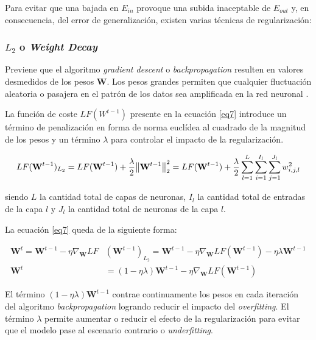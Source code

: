 Para evitar que una bajada en $E_{in}$ provoque una subida inaceptable de $E_{out}$ y, en consecuencia, del error de generalización, existen varias técnicas de regularización:

\subsubsection{$L_2$ o \textit{Weight Decay}}
Previene que el algoritmo \textit{gradient descent} o \textit{backpropagation} resulten en valores desmedidos de los pesos $\textbf{W}$. Los pesos grandes permiten que cualquier fluctuación aleatoria o pasajera en el patrón de los datos sea amplificada en la red neuronal \cite{weightdecay, paramtuning}. 

La función de coste $LF(W^{t-1})$ presente en la ecuación \ref{eq7} introduce un término de penalización en forma de norma euclídea al cuadrado de la magnitud de los pesos y un término $\lambda$ para controlar el impacto de la regularización.

\begin{equation}
	LF(\textbf{W}^{t-1})_{L_2} = LF(\textbf{W}^{t-1}) + \frac{\lambda}{2} \norm{\textbf{W}^{t-1}}^2_2 = LF(\textbf{W}^{t-1}) + \frac{\lambda}{2} \sum_{l=1}^{L}\sum_{i=1}^{I_l}\sum_{j=1}^{J_l}w_{i,j,l}^2
\end{equation}

siendo $L$ la cantidad total de capas de neuronas, $I_l$ la cantidad total de entradas de la capa $l$ y $J_l$ la cantidad total de neuronas de la capa $l$.

La ecuación \ref{eq7} queda de la siguiente forma:


\begin{align}
	\textbf{W}^t=\textbf{W}^{t-1}-\eta \nabla_\textbf{W}LF&(\textbf{W}^{t-1})_{L_2} = \textbf{W}^{t-1} - \eta \nabla_\textbf{W}LF(\textbf{W}^{t-1}) - \eta\lambda \textbf{W}^{t-1} \\
	\textbf{W}^t &= (1-\eta\lambda) \textbf{W}^{t-1} - \eta \nabla_\textbf{W}LF(\textbf{W}^{t-1}) 
\end{align}

El término $(1-\eta\lambda) \textbf{W}^{t-1}$ contrae continuamente los pesos en cada iteración del algoritmo \textit{backpropagation} logrando reducir el impacto del \textit{overfitting}. El término $\lambda$ permite aumentar o reducir el efecto de la regularización para evitar que el modelo pase al escenario contrario o \textit{underfitting}.





